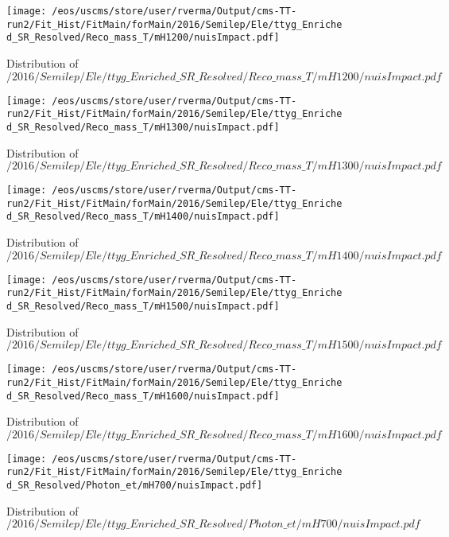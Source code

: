 \begin{figure}
\centering
\texttt{[image: /eos/uscms/store/user/rverma/Output/cms-TT-run2/Fit\_Hist/FitMain/forMain/2016/Semilep/Ele/ttyg\_Enriched\_SR\_Resolved/Reco\_mass\_T/mH1200/nuisImpact.pdf]}
\caption{Distribution of $/2016/Semilep/Ele/ttyg\_Enriched\_SR\_Resolved/Reco\_mass\_T/mH1200/nuisImpact.pdf$}
\end{figure}

\begin{figure}
\centering
\texttt{[image: /eos/uscms/store/user/rverma/Output/cms-TT-run2/Fit\_Hist/FitMain/forMain/2016/Semilep/Ele/ttyg\_Enriched\_SR\_Resolved/Reco\_mass\_T/mH1300/nuisImpact.pdf]}
\caption{Distribution of $/2016/Semilep/Ele/ttyg\_Enriched\_SR\_Resolved/Reco\_mass\_T/mH1300/nuisImpact.pdf$}
\end{figure}

\begin{figure}
\centering
\texttt{[image: /eos/uscms/store/user/rverma/Output/cms-TT-run2/Fit\_Hist/FitMain/forMain/2016/Semilep/Ele/ttyg\_Enriched\_SR\_Resolved/Reco\_mass\_T/mH1400/nuisImpact.pdf]}
\caption{Distribution of $/2016/Semilep/Ele/ttyg\_Enriched\_SR\_Resolved/Reco\_mass\_T/mH1400/nuisImpact.pdf$}
\end{figure}

\begin{figure}
\centering
\texttt{[image: /eos/uscms/store/user/rverma/Output/cms-TT-run2/Fit\_Hist/FitMain/forMain/2016/Semilep/Ele/ttyg\_Enriched\_SR\_Resolved/Reco\_mass\_T/mH1500/nuisImpact.pdf]}
\caption{Distribution of $/2016/Semilep/Ele/ttyg\_Enriched\_SR\_Resolved/Reco\_mass\_T/mH1500/nuisImpact.pdf$}
\end{figure}

\begin{figure}
\centering
\texttt{[image: /eos/uscms/store/user/rverma/Output/cms-TT-run2/Fit\_Hist/FitMain/forMain/2016/Semilep/Ele/ttyg\_Enriched\_SR\_Resolved/Reco\_mass\_T/mH1600/nuisImpact.pdf]}
\caption{Distribution of $/2016/Semilep/Ele/ttyg\_Enriched\_SR\_Resolved/Reco\_mass\_T/mH1600/nuisImpact.pdf$}
\end{figure}

\begin{figure}
\centering
\texttt{[image: /eos/uscms/store/user/rverma/Output/cms-TT-run2/Fit\_Hist/FitMain/forMain/2016/Semilep/Ele/ttyg\_Enriched\_SR\_Resolved/Photon\_et/mH700/nuisImpact.pdf]}
\caption{Distribution of $/2016/Semilep/Ele/ttyg\_Enriched\_SR\_Resolved/Photon\_et/mH700/nuisImpact.pdf$}
\end{figure}

